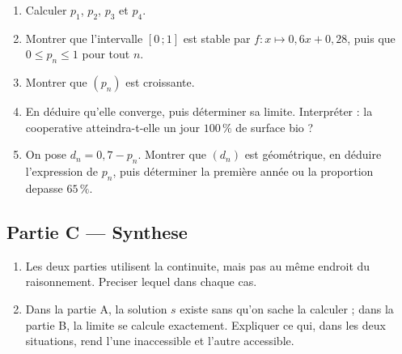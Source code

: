 \begin{enumerate}
  \item Calculer $p_1$, $p_2$, $p_3$ et $p_4$.
  \item Montrer que l'intervalle $[0\,;1]$ est stable par $f : x \mapsto 0{,}6x + 0{,}28$,
  puis que $0 \leq p_n \leq 1$ pour tout $n$.
  \item Montrer que $(p_n)$ est croissante.
  \item En déduire qu'elle converge, puis déterminer sa limite. Interpréter :
  la cooperative atteindra-t-elle un jour $100\,\%$ de surface bio ?
  \item On pose $d_n = 0{,}7 - p_n$. Montrer que $(d_n)$ est géométrique, en
  déduire l'expression de $p_n$, puis déterminer la première année ou la
  proportion depasse $65\,\%$.
\end{enumerate}

\subsection*{Partie C — Synthese}

\begin{enumerate}
  \item Les deux parties utilisent la continuite, mais pas au même endroit du
  raisonnement. Preciser lequel dans chaque cas.
  \item Dans la partie A, la solution $s$ existe sans qu'on sache la calculer ;
  dans la partie B, la limite se calcule exactement. Expliquer ce qui, dans les
  deux situations, rend l'une inaccessible et l'autre accessible.
\end{enumerate}
